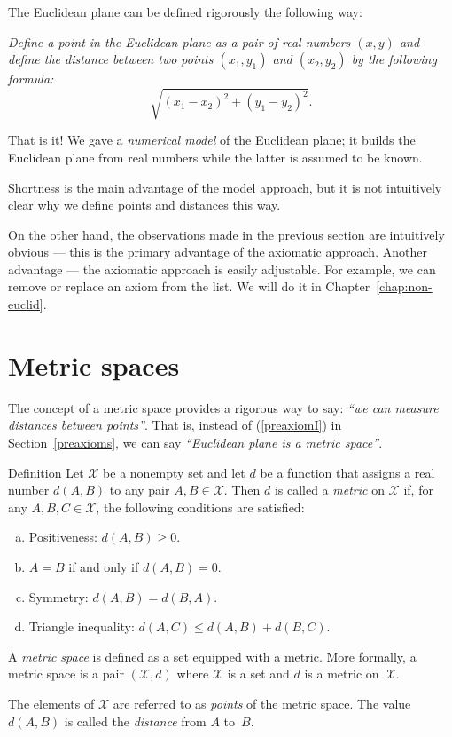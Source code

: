 The Euclidean plane can be defined rigorously the following way:

\textit{Define a {}\emph{point} in the Euclidean plane as a pair of real numbers $(x,y)$ and define the {}\emph{distance} between two points $(x_1,y_1)$ and $(x_2,y_2)$ by the following formula:}
\[\sqrt{(x_1-x_2)^2+(y_1-y_2)^2}.\]

That is it!
We gave a {}\emph{numerical model} of the Euclidean plane;
it builds the Euclidean plane from real numbers
while the latter is assumed to be known.

Shortness is the main advantage of the model approach,
but it is not intuitively clear why we define points and distances this way.

On the other hand, the observations made in the previous section are intuitively obvious ---
this is the primary advantage of the axiomatic approach.
Another advantage --- the axiomatic approach is easily adjustable. 
For example, we can remove or replace an axiom from the list. 
We will do it in Chapter~\ref{chap:non-euclid}.

\section{Metric spaces}

The concept of a metric space provides 
a rigorous way to say: \textit{``we can measure distances between points''}.
That is, instead of (\ref{preaxiomI}) in Section~\ref{preaxioms},
we can say \textit{``Euclidean plane is a metric space''}.

\begin{thm}{Definition}\label{def:metric-space}
Let $\mathcal X$ be a nonempty set and 
let $d$ be a function
that assigns a real number $d(A,B)$
to any pair $A,B\in\mathcal X$.
Then $d$ is called a \emph{metric} on 
$\mathcal X$ if, for any
$A,B,C\in \mathcal X$, the following conditions are satisfied:
\begin{enumerate}[(a)]
\item\label{def:metric-space:a} Positiveness: 
$d(A,B)\ge 0.$
\item\label{def:metric-space:b} $A=B$ if and only if 
$d(A,B)=0.$
\item\label{def:metric-space:c} Symmetry: $d(A, B) = d(B, A).$
\item\label{def:metric-space:d} Triangle inequality: 
$d(A, C) \le d(A, B) + d(B, C).$
\end{enumerate}
A \emph{metric space} is defined as a set equipped with a metric. 
More formally, a metric space is a pair $(\mathcal X, d)$ where $\mathcal X$ is a set and $d$ is a metric on~$\mathcal X$.

The elements of $\mathcal X$ are referred to as \emph{points} of the metric space.
The value $d(A, B)$ is called the \emph{distance} from $A$ to~$B$.
\end{thm}

